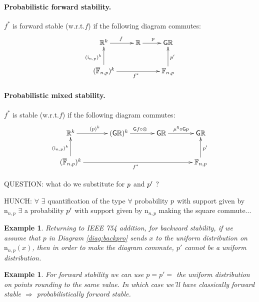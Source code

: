 \documentclass[10pt,a4paper]{article}
\theoremstyle{plain}
\newtheorem{example}[theorem]{Example}
\theoremstyle{definition}
\newcommand{\F}[1][n,p]{\mathbb{F}_{#1}}
\newcommand{\Ff}[1][n,p]{\overline{\mathbb{F}}_{#1}}
\newcommand{\R}{\mathbb{R}}
\newcommand{\Rep}[1][n,p]{\mathrm{i}_{#1}}
\newcommand{\Giry}{\mathsf{G}}
\newcommand{\nd}[1][n,p]{\mathrm{n}_{#1}}
\begin{document}
\paragraph{Probabilistic forward stability.} $f^\ast$ is forward stable (w.r.t.\@ $f$) if the following diagram commutes:
\begin{equation}\label{diag:forpro}
\xymatrix
{
\R^k\ar[r]^{f} & \R\ar[r]^{\pro} & \Giry \R\\
(\Ff)^k\ar[rr]_{f^\ast}\ar[u]^{(\Rep)^k} & & \F\ar[u]_{\prob}
}
\end{equation}
\paragraph{Probabilistic mixed stability.} $f^\ast$ is stable (w.r.t.\@ $f$) if the following diagram commutes:
\begin{equation}\label{diag:mixedpro}
\xymatrix@C=8ex
{
\R^k\ar[r]^{(\pro)^k} & (\Giry\R)^k\ar[r]^{\Giry f\circ \otimes} & \Giry \R\ar[r]^{\mu^{\Giry}\circ \Giry \pro} & \Giry\R \\
(\Ff)^k\ar[rrr]_{f^\ast}\ar[u]^{(\Rep)^k} & & & \F\ar[u]_{\prob}
}
\end{equation}

\noindent QUESTION: what do we substitute for  $p$ and $p'$ ?

\noindent HUNCH: $\forall$ $\exists$ quantification of the type $\forall$ probability $p$ with support given by $\nd$ $\exists$ a probability $p'$ with support given by $\nd$ making the square commute...

\begin{example}
Returning to IEEE 754 addition, for backward stability, if we assume that $p$ in Diagram \eqref{diag:backpro} sends $x$ to the uniform distribution on $\nd(x)$, then in order to make the diagram commute, $p'$ cannot be a uniform distribution.  
\end{example}

\begin{example}
For forward stability we can use $p=p'=$ the uniform distribution on points rounding to the same value. In which case we'll have classically forward stable $\Rightarrow$ probabilistically forward stable.
\end{example}


\end{document}

